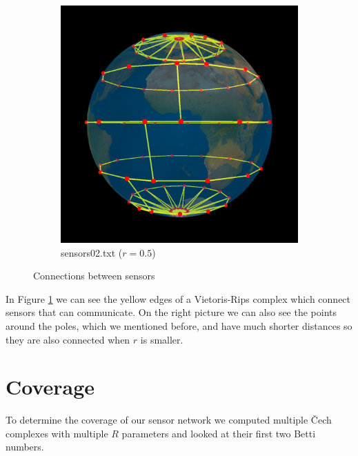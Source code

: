 \documentclass[a4paper, 12pt]{article}
\begin{document}
\begin{figure}[H]
{\begin{subfigure}[b]{0.50\textwidth}
                \includegraphics[width=\textwidth]{../images/connections02}
                \caption{sensors02.txt ($r=0.5$)}
            \end{subfigure}
        }
        \caption{Connections between sensors}
        \label{connections}
\end{figure}
In Figure \ref{connections} we can see the yellow edges of a Vietoris-Rips complex which connect sensors that can communicate. On the right picture we can also see the points around the poles, which we mentioned before, and have much shorter distances so they are also connected when $r$ is smaller.

\section{Coverage}
To determine the coverage of our sensor network we computed multiple Čech complexes with multiple $R$ parameters and looked at their first two Betti numbers. 
\end{document}
